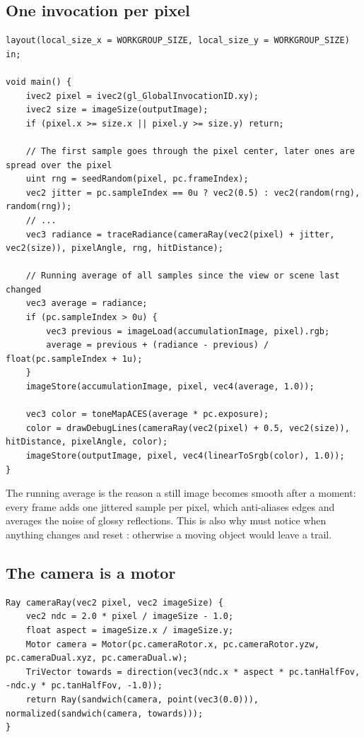 \documentclass[11pt,a4paper]{article}
\begin{document}
\subsection{One invocation per pixel}

\begin{lstlisting}[style=glsl]
layout(local_size_x = WORKGROUP_SIZE, local_size_y = WORKGROUP_SIZE) in;

void main() {
    ivec2 pixel = ivec2(gl_GlobalInvocationID.xy);
    ivec2 size = imageSize(outputImage);
    if (pixel.x >= size.x || pixel.y >= size.y) return;

    // The first sample goes through the pixel center, later ones are spread over the pixel
    uint rng = seedRandom(pixel, pc.frameIndex);
    vec2 jitter = pc.sampleIndex == 0u ? vec2(0.5) : vec2(random(rng), random(rng));
    // ...
    vec3 radiance = traceRadiance(cameraRay(vec2(pixel) + jitter, vec2(size)), pixelAngle, rng, hitDistance);

    // Running average of all samples since the view or scene last changed
    vec3 average = radiance;
    if (pc.sampleIndex > 0u) {
        vec3 previous = imageLoad(accumulationImage, pixel).rgb;
        average = previous + (radiance - previous) / float(pc.sampleIndex + 1u);
    }
    imageStore(accumulationImage, pixel, vec4(average, 1.0));

    vec3 color = toneMapACES(average * pc.exposure);
    color = drawDebugLines(cameraRay(vec2(pixel) + 0.5, vec2(size)), hitDistance, pixelAngle, color);
    imageStore(outputImage, pixel, vec4(linearToSrgb(color), 1.0));
}
\end{lstlisting}

The running average is the reason a still image becomes smooth after a moment: every frame adds one jittered sample per pixel, which anti-aliases edges and averages the noise of glossy reflections. This is also why  must notice when anything changes and reset : otherwise a moving object would leave a trail.

\subsection{The camera is a motor}

\begin{lstlisting}[style=glsl]
Ray cameraRay(vec2 pixel, vec2 imageSize) {
    vec2 ndc = 2.0 * pixel / imageSize - 1.0;
    float aspect = imageSize.x / imageSize.y;
    Motor camera = Motor(pc.cameraRotor.x, pc.cameraRotor.yzw, pc.cameraDual.xyz, pc.cameraDual.w);
    TriVector towards = direction(vec3(ndc.x * aspect * pc.tanHalfFov, -ndc.y * pc.tanHalfFov, -1.0));
    return Ray(sandwich(camera, point(vec3(0.0))), normalized(sandwich(camera, towards)));
}
\end{lstlisting}
\end{document}
